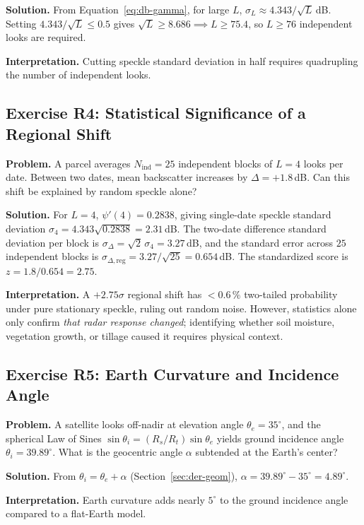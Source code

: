 \documentclass[11pt,a4paper]{article}
\begin{document}
\textbf{Solution.} From Equation~\eqref{eq:db-gamma}, for large $L$, $\sigma_L\approx 4.343/\sqrt L$\,dB. Setting $4.343/\sqrt L \le 0.5$ gives $\sqrt L \ge 8.686 \implies L \ge 75.4$, so $L \ge 76$ independent looks are required.

\textbf{Interpretation.} Cutting speckle standard deviation in half requires quadrupling the number of independent looks.

\subsection*{Exercise R4: Statistical Significance of a Regional Shift}
\textbf{Problem.} A parcel averages $N_{\mathrm{ind}}=25$ independent blocks of $L=4$ looks per date. Between two dates, mean backscatter increases by $\Delta=+1.8$\,dB. Can this shift be explained by random speckle alone?

\textbf{Solution.} For $L=4$, $\psi'(4)=0.2838$, giving single-date speckle standard deviation $\sigma_4 = 4.343\sqrt{0.2838}=2.31$\,dB. The two-date difference standard deviation per block is $\sigma_\Delta=\sqrt2\,\sigma_4=3.27$\,dB, and the standard error across $25$ independent blocks is $\sigma_{\Delta,\text{reg}} = 3.27/\sqrt{25}=0.654$\,dB. The standardized score is $z = 1.8/0.654 = 2.75$.

\textbf{Interpretation.} A $+2.75\sigma$ regional shift has $<0.6\,\%$ two-tailed probability under pure stationary speckle, ruling out random noise. However, statistics alone only confirm \emph{that radar response changed}; identifying whether soil moisture, vegetation growth, or tillage caused it requires physical context.

\subsection*{Exercise R5: Earth Curvature and Incidence Angle}
\textbf{Problem.} A satellite looks off-nadir at elevation angle $\theta_e=35^\circ$, and the spherical Law of Sines $\sin\theta_i=(R_s/R_t)\sin\theta_e$ yields ground incidence angle $\theta_i=39.89^\circ$. What is the geocentric angle $\alpha$ subtended at the Earth's center?

\textbf{Solution.} From $\theta_i=\theta_e+\alpha$ (Section~\ref{sec:der-geom}), $\alpha=39.89^\circ-35^\circ=4.89^\circ$.

\textbf{Interpretation.} Earth curvature adds nearly $5^\circ$ to the ground incidence angle compared to a flat-Earth model.
\end{document}

